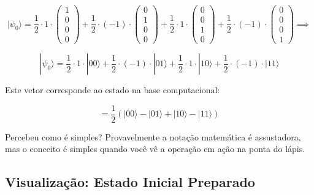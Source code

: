 \documentclass[
  brazilian,
]{report}
\begin{document}
\[|\psi_0\rangle = \frac{1}{2} \cdot 1 \cdot \begin{pmatrix} 1 \\ 0 \\ 0 \\ 0 \end{pmatrix} + \frac{1}{2} \cdot (-1) \cdot \begin{pmatrix} 0 \\ 1 \\ 0 \\ 0 \end{pmatrix} + \frac{1}{2} \cdot 1 \cdot \begin{pmatrix} 0 \\ 0 \\ 1 \\ 0 \end{pmatrix} + \frac{1}{2} \cdot (-1) \cdot \begin{pmatrix} 0 \\ 0 \\ 0 \\ 1 \end{pmatrix} \implies\]

\[|\psi_0\rangle = \frac{1}{2} \cdot 1 \cdot |00\rangle + \frac{1}{2} \cdot (-1) \cdot |01\rangle + \frac{1}{2} \cdot 1 \cdot |10\rangle + \frac{1}{2} \cdot (-1) \cdot |11\rangle\]

Este vetor corresponde ao estado na base computacional:

\[= \frac{1}{2}(|00\rangle - |01\rangle + |10\rangle - |11\rangle)\]

Percebeu como é simples? Provavelmente a notação matemática é
assustadora, mas o conceito é simples quando você vê a operação em ação
na ponta do lápis.

\subsection{Visualização: Estado Inicial
Preparado}\label{visualizauxe7uxe3o-estado-inicial-preparado}
\end{document}

